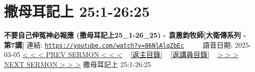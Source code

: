 \documentclass{book}
\begin{document}
\section{撒母耳記上 25:1-26:25}
\label{sec:86NlAlqZbEc}
\textbf{不要自己伸冤神必報應 (撒母耳記上25\_1-26\_25) - 袁惠鈞牧師[大衛傳系列 - 第7講]}
\newline
\newline
連結: \href{https://youtube.com/watch?v=86NlAlqZbEc}{\texttt{https://youtube.com/watch?v=86NlAlqZbEc}} ~~~~ 語音日期: 2025-03-05
\newline
\newline
\hyperref[sec:GqTOPwqfjwM]{< < < PREV SERMON < < <}
~
\hyperlink{toc}{[返主目錄]}
~
\hyperref[ch:preacher11]{[返講員目錄]}
~
\hyperref[sec:KIOzsSOi_wU]{> > > NEXT SERMON > > >}
\newline
\newline
撒母耳記上 25:1-26:25
\newline
\end{document}
